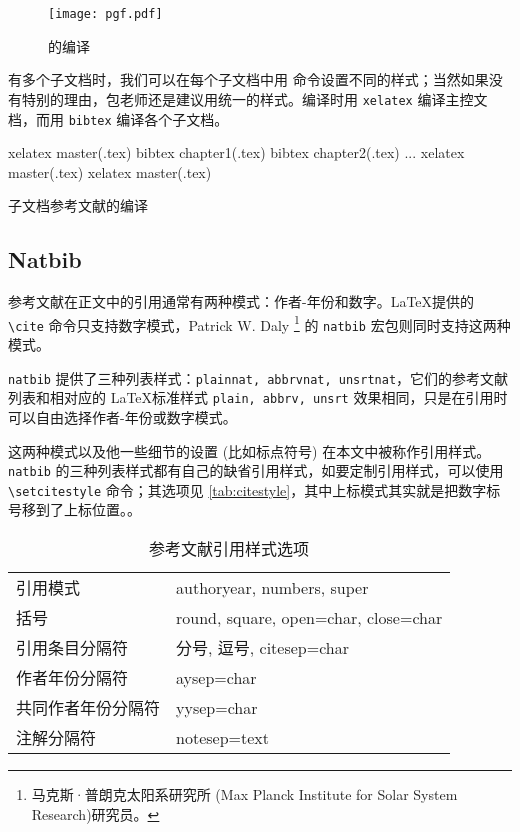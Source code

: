 \begin{figure}[htbp]
\centering
\texttt{[image: pgf.pdf]}
\caption{\BibTeX 的编译}
\label{fig:bibtex}
\end{figure}

有多个子文档时，我们可以在每个子文档中用 \verb|| 命令设置不同的样式；当然如果没有特别的理由，包老师还是建议用统一的样式。编译时用 \texttt{xelatex} 编译主控文档，而用 \texttt{bibtex} 编译各个子文档。

\begin{example}[h]
\begin{Code}[numbers=left]
xelatex master(.tex)
bibtex chapter1(.tex)
bibtex chapter2(.tex)
...
xelatex master(.tex)
xelatex master(.tex)
\end{Code}
\caption{子文档参考文献的编译}
\label{exa:subdoc_bibtex}
\end{example}

\subsection{Natbib}

参考文献在正文中的引用通常有两种模式：作者-年份和数字。\LaTeX 提供的 \verb|\cite| 命令只支持数字模式，Patrick W. Daly\indexDaly{} \footnote{马克斯·普朗克太阳系研究所 (Max Planck Institute for Solar System Research)\indexMPS 研究员。} 的 \texttt{natbib} 宏包\citep{Daly_2010}则同时支持这两种模式。

\texttt{natbib} 提供了三种列表样式：\texttt{plainnat, abbrvnat, unsrtnat}，它们的参考文献列表和相对应的 \LaTeX 标准样式 \texttt{plain, abbrv, unsrt} 效果相同，只是在引用时可以自由选择作者-年份或数字模式。

这两种模式以及他一些细节的设置 (比如标点符号) 在本文中被称作引用样式。\texttt{natbib} 的三种列表样式都有自己的缺省引用样式，如要定制引用样式，可以使用 \verb|\setcitestyle| 命令；其选项见 \autoref{tab:citestyle}，其中上标模式其实就是把数字标号移到了上标位置。。

\begin{table}[htbp]
\caption{参考文献引用样式选项}
\label{tab:citestyle}
\centering
\begin{tabular}{ll}
    \toprule
    引用模式            & authoryear, numbers, super \\
    括号                & round, square, open={char}, close={char} \\
    引用条目分隔符      & 分号, 逗号, citesep={char} \\
    作者年份分隔符      & aysep={char} \\
    共同作者年份分隔符  & yysep={char} \\
    注解分隔符          & notesep={text} \\
    \bottomrule
\end{tabular}
\end{table}

